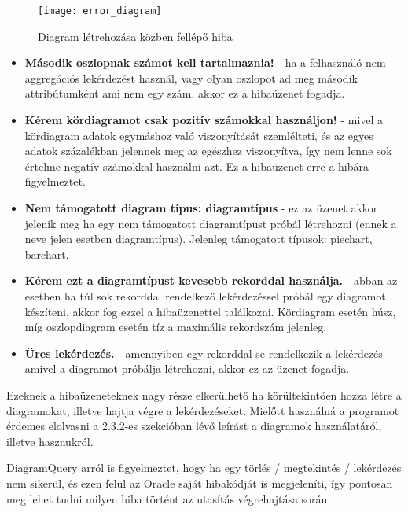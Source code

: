 \begin{figure}[ht]
  \begin{center}
  \texttt{[image: error\_diagram]}
  \end{center}
 \caption{Diagram létrehozása közben fellépő hiba}
\end{figure}

\begin{itemize}
  \item \textbf{Második oszlopnak számot kell tartalmaznia!} - ha a felhasználó nem aggregációs lekérdezést használ, vagy olyan oszlopot ad meg második attribútumként ami nem egy
  szám, akkor ez a hibaüzenet fogadja.
  \item \textbf{Kérem kördiagramot csak pozitív számokkal használjon!} - mivel a kördiagram adatok egymáshoz való viszonyítását szemlélteti, és az egyes adatok százalékban jelennek meg
  az egészhez viszonyítva, így nem lenne sok értelme negatív számokkal használni azt. Ez a hibaüzenet erre a hibára figyelmeztet.
  \item \textbf{Nem támogatott diagram típus: diagramtípus} - ez az üzenet akkor jelenik meg ha egy nem támogatott diagramtípust próbál létrehozni (ennek a neve jelen
  esetben diagramtípus). Jelenleg támogatott típusok: piechart, barchart.
  \item \textbf{Kérem ezt a diagramtípust kevesebb rekorddal használja.} - abban az esetben ha túl sok rekorddal rendelkező lekérdezéssel próbál egy diagramot készíteni, akkor
  fog ezzel a hibaüzenettel találkozni. Kördiagram esetén húsz, míg oszlopdiagram esetén tíz a maximális rekordszám jelenleg.
  \item \textbf{Üres lekérdezés.} - amennyiben egy rekorddal se rendelkezik a lekérdezés amivel a diagramot próbálja létrehozni, akkor ez az üzenet fogadja.
\end{itemize}

Ezeknek a hibaüzeneteknek nagy része elkerülhető ha körültekintően hozza létre a diagramokat, illetve hajtja végre a lekérdezéseket. Mielőtt használná a programot
érdemes elolvasni a 2.3.2-es szekcióban lévő leírást a diagramok használatáról, illetve hasznukról.

DiagramQuery arról is figyelmeztet, hogy ha egy törlés / megtekintés / lekérdezés nem sikerül, és ezen felül az Oracle saját hibakódját is megjeleníti, így pontosan
meg lehet tudni milyen hiba történt az utasítás végrehajtása során.